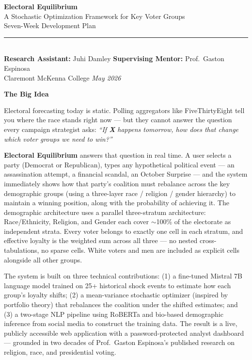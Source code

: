 \documentclass[11pt]{article}
\begin{document}
\begin{center}
  {\LARGE\bfseries Electoral Equilibrium}\\[4pt]
  {\large A Stochastic Optimization Framework for Key Voter Groups}\\[8pt]
  {\large Seven-Week Development Plan}\\[10pt]
  \rule{0.6\linewidth}{0.8pt}\\[6pt]
  {\normalsize
    \textbf{Research Assistant:} Juhi Damley \quad
    \textbf{Supervising Mentor:} Prof.\ Gaston Espinosa\\[3pt]
    Claremont McKenna College \quad
    \textit{May 2026}
  }
\end{center}

\vspace{8pt}

\begin{mdframed}[backgroundcolor=lightgray!60, linecolor=sectionblue,
  linewidth=1pt, innerleftmargin=14pt, innerrightmargin=14pt,
  innertopmargin=10pt, innerbottommargin=10pt]
\textbf{\large The Big Idea}

\medskip
Electoral forecasting today is static. Polling aggregators like FiveThirtyEight
tell you where the race stands right now --- but they cannot answer the question
every campaign strategist asks: \textit{``If \textbf{X} happens tomorrow, how does
that change which voter groups we need to win?''}

\medskip
\textbf{Electoral Equilibrium} answers that question in real time. A user selects
a party (Democrat or Republican), types any hypothetical political event --- an
assassination attempt, a financial scandal, an October Surprise --- and the system
immediately shows how that party's coalition must rebalance across the key demographic
groups (using a three-layer race / religion / gender hierarchy) to maintain a winning
position,
along with the probability of achieving it. The demographic architecture uses a parallel three-stratum architecture: Race/Ethnicity, Religion, and Gender
each cover $\sim$100\% of the electorate as independent strata. Every voter
belongs to exactly one cell in each stratum, and effective loyalty is the
weighted sum across all three --- no nested cross-tabulations, no sparse cells.
White voters and men are included as explicit cells alongside all other groups.

\medskip
The system is built on three technical contributions: (1) a fine-tuned Mistral 7B
language model trained on 25+ historical shock events to estimate how each group's
loyalty shifts; (2) a mean-variance stochastic optimizer (inspired by portfolio theory)
that rebalances the coalition under the shifted estimates; and (3) a two-stage NLP
pipeline using RoBERTa and bio-based demographic inference from social media to
construct the training data. The result is a live, publicly accessible web application
with a password-protected analyst dashboard --- grounded in two decades of Prof.\
Gaston Espinosa's published research on religion, race, and presidential voting.
\end{mdframed}
\end{document}
